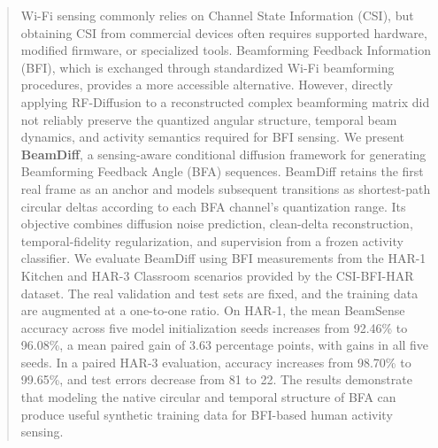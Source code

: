 \begin{abstract}
Wi-Fi sensing commonly relies on Channel State Information (CSI), but obtaining
CSI from commercial devices often requires supported hardware, modified
firmware, or specialized tools. Beamforming Feedback Information (BFI), which
is exchanged through standardized Wi-Fi beamforming procedures, provides a more
accessible alternative. However, directly applying RF-Diffusion to a
reconstructed complex beamforming matrix did not reliably preserve the
quantized angular structure, temporal beam dynamics, and activity semantics
required for BFI sensing. We present \textbf{BeamDiff}, a sensing-aware
conditional diffusion framework for generating Beamforming Feedback Angle
(BFA) sequences. BeamDiff retains the first real frame as an anchor and models
subsequent transitions as shortest-path circular deltas according to each BFA
channel's quantization range. Its objective combines diffusion noise prediction,
clean-delta reconstruction, temporal-fidelity regularization, and supervision
from a frozen activity classifier. We evaluate BeamDiff using BFI measurements
from the HAR-1 Kitchen and HAR-3 Classroom scenarios provided by the
CSI-BFI-HAR dataset. The real validation and test sets are fixed, and the
training data are augmented at a one-to-one ratio. On HAR-1, the mean BeamSense
accuracy across five model initialization seeds increases from 92.46\% to
96.08\%, a mean paired gain of 3.63 percentage points, with gains in all five
seeds. In a paired HAR-3 evaluation, accuracy increases from 98.70\% to
99.65\%, and test errors decrease from 81 to 22. The results demonstrate that
modeling the native circular and temporal structure of BFA can produce useful
synthetic training data for BFI-based human activity sensing.
\end{abstract}
